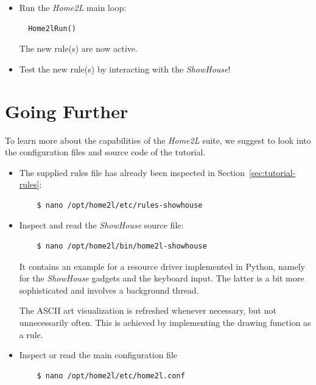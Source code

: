 \documentclass[12pt,english,parskip=half]{scrreprt}
\begin{document}
\begin{itemize}[$\blacktriangleright$]
\item
  Run the \emph{Home2L} main loop:
  \begin{lstlisting}
  Home2lRun()
  \end{lstlisting}
  The new rule(s) are now active.

\item
  Test the new rule(s) by interacting with the \emph{ShowHouse}!

\end{itemize}





\section{Going Further}
\label{sec:tutorial-goingfurther}


To learn more about the capabilities of the \emph{Home2L} suite, we
suggest to look into the configuration files and source code of the
tutorial.

\begin{itemize}[$\blacktriangleright$]

\item
  The supplied rules file has already been inspected in Section~\ref{sec:tutorial-rules}:
  \begin{lstlisting}
    $ nano /opt/home2l/etc/rules-showhouse
  \end{lstlisting}

\item
  Inspect and read the \emph{ShowHouse} source file:
  \begin{lstlisting}
    $ nano /opt/home2l/bin/home2l-showhouse
  \end{lstlisting}

  It contains an example for a resource driver implemented in Python,
  namely for the \emph{ShowHouse} gadgets and the keyboard input. The
  latter is a bit more sophisticated and involves a background thread.

  The ASCII art visualization is refreshed whenever necessary, but not
  unnecessarily often. This is achieved by implementing the drawing function as a rule.

\item
  Inspect or read the main configuration file
  \begin{lstlisting}
    $ nano /opt/home2l/etc/home2l.conf
  \end{lstlisting}

\end{itemize}
\end{document}
